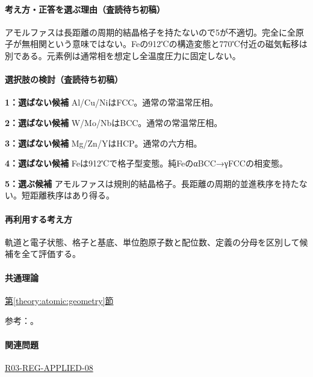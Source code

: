 \paragraph{考え方・正答を選ぶ理由（査読待ち初稿）} アモルファスは長距離の周期的結晶格子を持たないので5が不適切。完全に全原子が無相関という意味ではない。Feの912℃の構造変態と770℃付近の磁気転移は別である。元素例は通常相を想定し全温度圧力に固定しない。

\paragraph{選択肢の検討（査読待ち初稿）}\mbox{}\par

\noindent\textbf{1：選ばない候補} Al/Cu/NiはFCC。通常の常温常圧相。\par

\noindent\textbf{2：選ばない候補} W/Mo/NbはBCC。通常の常温常圧相。\par

\noindent\textbf{3：選ばない候補} Mg/Zn/YはHCP。通常の六方相。\par

\noindent\textbf{4：選ばない候補} Feは912℃で格子型変態。純FeのαBCC→γFCCの相変態。\par

\noindent\textbf{5：選ぶ候補} アモルファスは規則的結晶格子。長距離の周期的並進秩序を持たない。短距離秩序はあり得る。\par

\paragraph{再利用する考え方} 軌道と電子状態、格子と基底、単位胞原子数と配位数、定義の分母を区別して候補を全て評価する。

\paragraph{共通理論} \hyperref[theory:atomic:geometry]{第\ref*{theory:atomic:geometry}節}

\par 参考：\cite{princeton_iron,princeton_tungsten,openstax_crystals}。

\paragraph{関連問題} \hyperref[q:r03-reg-applied-08]{R03-REG-APPLIED-08}

